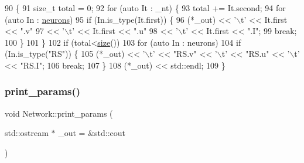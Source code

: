 \begin{DoxyCode}
90                                            \{
91     \textcolor{keywordtype}{size\_t} total = 0;
92     \textcolor{keywordflow}{for} (\textcolor{keyword}{auto} It : \_nt) \{
93         total += It.second;
94         \textcolor{keywordflow}{for} (\textcolor{keyword}{auto} In : \hyperlink{classNetwork_a1b7832bc2c7b8855cdc3b2d6329eff9d}{neurons})
95             \textcolor{keywordflow}{if} (In.is\_type(It.first)) \{
96                 (*\_out) << \textcolor{charliteral}{'\(\backslash\)t'} << It.first << \textcolor{stringliteral}{".v"}
97                         << \textcolor{charliteral}{'\(\backslash\)t'} << It.first << \textcolor{stringliteral}{".u"}
98                         << \textcolor{charliteral}{'\(\backslash\)t'} << It.first << \textcolor{stringliteral}{".I"};
99                 \textcolor{keywordflow}{break};
100             \}
101     \}
102     \textcolor{keywordflow}{if} (total<\hyperlink{classNetwork_a41c54d12d861883170b5c5abca3a7bc8}{size}())
103         \textcolor{keywordflow}{for} (\textcolor{keyword}{auto} In : neurons) 
104             \textcolor{keywordflow}{if} (In.is\_type(\textcolor{stringliteral}{"RS"})) \{
105                 (*\_out) << \textcolor{charliteral}{'\(\backslash\)t'} << \textcolor{stringliteral}{"RS.v"} << \textcolor{charliteral}{'\(\backslash\)t'} << \textcolor{stringliteral}{"RS.u"} << \textcolor{charliteral}{'\(\backslash\)t'} << \textcolor{stringliteral}{"RS.I"};
106                 \textcolor{keywordflow}{break};
107             \}
108     (*\_out) << std::endl;
109 \}
\end{DoxyCode}
\mbox{\label{classNetwork_afc43116eb2429aeec0f3c6a54d252142}} 
\subsubsection{\texorpdfstring{print\+\_\+params()}{print\_params()}}
{\footnotesize\ttfamily void Network\+::print\+\_\+params (\begin{DoxyParamCaption}\item[{std\+::ostream $\ast$}]{\+\_\+out = {\ttfamily \&std\+:\+:cout} }\end{DoxyParamCaption})}


